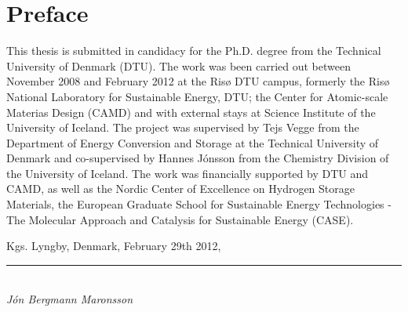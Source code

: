 \section*{Preface}

This thesis is submitted in candidacy for the Ph.D. degree from the Technical University of Denmark (DTU).
The work was been carried out between November 2008 and February 2012 at the Ris\o{} DTU campus, formerly the Ris\o{} National Laboratory for Sustainable Energy, DTU; the Center for Atomic-scale Materias Design (CAMD) and with external stays at Science Institute of the University of Iceland.
The project was supervised by Tejs Vegge from the Department of Energy Conversion and Storage at the Technical University of Denmark and co-supervised by Hannes J\'onsson from the Chemistry Division of the University of Iceland.
The work was financially supported by DTU and CAMD, as well as the Nordic Center of Excellence on Hydrogen Storage Materials, the European Graduate School for Sustainable Energy Technologies - The Molecular Approach and Catalysis for Sustainable Energy (CASE).

\placeholder
\begin{comment}
At the end of my Ph.D. project, I would like to express my thanks many people.

First of all are my supervisors, Tejs Vegge and Hannes J\'onsson.
Tejs' ever positive attitude, always seeing the positive side in all situations served as an incredible inspiration to me both with regards to the project and life in general.
Every meeting of ours would leave me in a better place.
Hannes' involvement was essential to the project.
He is such a fountain of knowledge with regards to all aspects of my project.
I enjoyed our discussion of the sciences tremendously.

Then come my co-workers at DTU and Ris\o{} who are literally too many to appropriately thank each one.
The memers of Tejs Vegge's group who have come and gone.
My office buddies at DTU.

My trusty team of proofreaders and fellow group members warrant special thanks: Jakob Howalt, Steen Lysgaard, J\'on Steinar Gar\dh{}arsson M\'yrdal and Peter Jensen. Cake will be served.

Special thanks go to my lunch buddy and right-hand man Elvar \"Orn J\'onsson and his posse of Icelanders.

My friends, parents, grandparents and seemingly endless amount of siblings have a special place in my heart for tolerating long bouts of my stays abroad.

And finally my main buddy in chemistry (studies and that of the heart), Ester, I love you!
\end{comment}

\vspace{10mm}
\begin{flushright}
Kgs. Lyngby, Denmark, February 29th 2012,\\

\vspace{15mm}

\rule{50mm}{0.1pt}\\
\textit{J\'on Bergmann Maronsson}
\end{flushright}
